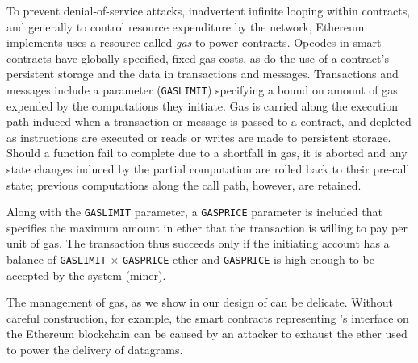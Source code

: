 To prevent denial-of-service attacks, inadvertent infinite looping within contracts, and generally to control resource expenditure by the network, Ethereum implements uses a resource called \emph{gas} to power contracts. Opcodes in smart contracts have globally specified, fixed gas costs, as do the use of a contract's persistent storage and the data in transactions and messages. Transactions and messages include a parameter (\texttt{GASLIMIT}) specifying a bound on amount of gas expended by the computations they initiate. Gas is carried along the execution path induced when a transaction or message is passed to a contract, and depleted as instructions are executed or reads or writes are made to persistent storage. Should a function fail to complete due to a shortfall in gas, it is aborted and any state changes induced by the partial computation are rolled back to their pre-call state; previous computations along the call path, however, are retained. 

Along with the \texttt{GASLIMIT} parameter, a \texttt{GASPRICE} parameter is included that specifies the maximum amount in ether that the transaction is willing to pay per unit of gas. The transaction thus succeeds only if the initiating account has a balance of \texttt{GASLIMIT} $\times$ \texttt{GASPRICE} ether and \texttt{GASPRICE} is high enough to be accepted by the system (miner). 

The management of gas, as we show in our design of \tcs can be delicate. Without careful construction, for example, the smart contracts representing \tc's interface on the Ethereum blockchain can be caused by an attacker to exhaust the ether used to power the delivery of datagrams. 




